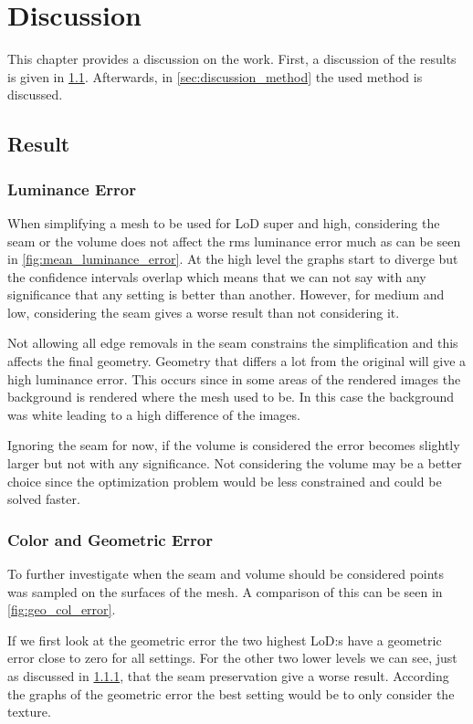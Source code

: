 \chapter{Discussion} \label{cha:discussion}
This chapter provides a discussion on the work. First, a discussion of the results is given in \cref{sec:discussion_result}. Afterwards, in \cref{sec:discussion_method} the used method is discussed.

\section{Result} \label{sec:discussion_result}


\subsection{Luminance Error} \label{sec:discussion_luminance}
When simplifying a mesh to be used for LoD super and high, considering the seam or the volume does not affect the rms luminance error much as can be seen in \cref{fig:mean_luminance_error}. At the high level the graphs start to diverge but the confidence intervals overlap which means that we can not say with any significance that any setting is better than another. However, for medium and low, considering the seam gives a worse result than not considering it.

Not allowing all edge removals in the seam constrains the simplification and this affects the final geometry. Geometry that differs a lot from the original will give a high luminance error. This occurs since in some areas of the rendered images the background is rendered where the mesh used to be. In this case the background was white leading to a high difference of the images.

Ignoring the seam for now, if the volume is considered the error becomes slightly larger but not with any significance. Not considering the volume may be a better choice since the optimization problem would be less constrained and could be solved faster.

\subsection{Color and Geometric Error} \label{sec:discussion_color_geom}
To further investigate when the seam and volume should be considered points was sampled on the surfaces of the mesh. A comparison of this can be seen in \cref{fig:geo_col_error}.

If we first look at the geometric error the two highest LoD:s have a geometric error close to zero for all settings. For the other two lower levels we can see, just as discussed in \cref{sec:discussion_luminance}, that the seam preservation give a worse result. According the graphs of the geometric error the best setting would be to only consider the texture.

